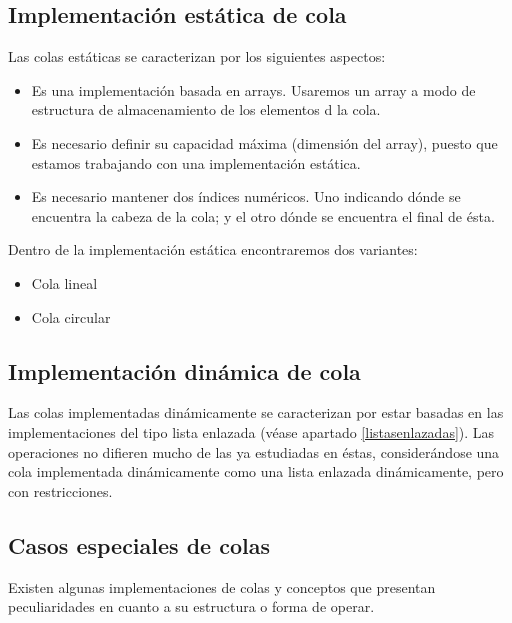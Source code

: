 \documentclass[a4paper, 11pt, titlepage]{article}
\begin{document}
    \subsection{Implementación estática de cola}

        Las colas estáticas se caracterizan por los siguientes aspectos:

        \begin{itemize}
            \item Es una implementación basada en arrays. Usaremos un array a modo de estructura de 
            almacenamiento de los elementos d la cola.
            \item Es necesario definir su capacidad máxima (dimensión del array), puesto que estamos 
            trabajando con una implementación estática.
            \item Es necesario mantener dos índices numéricos. Uno indicando dónde se encuentra la cabeza 
            de la cola; y el otro dónde se encuentra el final de ésta.
        \end{itemize}

        Dentro de la implementación estática encontraremos dos variantes:

        \begin{itemize}
            \item Cola lineal
            \item Cola circular
        \end{itemize}

    \subsection{Implementación dinámica de cola}

        Las colas implementadas dinámicamente se caracterizan por estar basadas en las implementaciones 
        del tipo lista enlazada (véase apartado \ref{listasenlazadas}). Las operaciones no difieren mucho 
        de las ya estudiadas en éstas, considerándose una cola implementada dinámicamente como una 
        lista enlazada dinámicamente, pero con restricciones.

    \subsection{Casos especiales de colas}

        Existen algunas implementaciones de colas y conceptos que presentan peculiaridades en cuanto a su 
        estructura o forma de operar.
        
\end{document}
